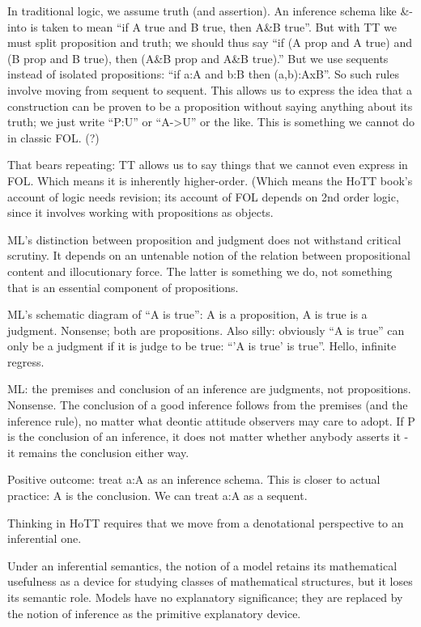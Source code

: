 \documentclass{article}
\begin{document}
In traditional logic, we assume truth (and assertion).  An inference
schema like \&-into is taken to mean ``if A true and B true, then A\&B
true''.  But with TT we must split proposition and truth; we should
thus say ``if (A prop and A true) and (B prop and B true), then (A\&B
prop and A\&B true).''  But we use sequents instead of isolated
propositions: ``if a:A and b:B then (a,b):AxB''.  So such rules
involve moving from sequent to sequent.  This allows us to express the
idea that a construction can be proven to be a proposition without
saying anything about its truth; we just write ``P:U'' or ``A->U'' or
the like.  This is something we cannot do in classic FOL. (?)

That bears repeating: TT allows us to say things that we cannot even
express in FOL.  Which means it is inherently higher-order.  (Which
means the HoTT book's account of logic needs revision; its account of
FOL depends on 2nd order logic, since it involves working with
propositions as objects.

ML's distinction  between proposition and judgment  does not withstand
critical scrutiny.  It depends on  an untenable notion of the relation
between propositional content and  illocutionary force.  The latter is
something  we do,  not something  that  is an  essential component  of
propositions.

ML's schematic diagram of ``A is true'': A is a proposition, A is true
is a judgment.  Nonsense; both are propositions.  Also silly:
obviously ``A is true'' can only be a judgment if it is judge to be
true: ``'A is true' is true''.  Hello, infinite regress.

ML: the premises and conclusion of an inference are judgments, not
propositions.  Nonsense.  The conclusion of a good inference follows
from the premises (and the inference rule), no matter what deontic
attitude observers may care to adopt.  If P is the conclusion of an
inference, it does not matter whether anybody asserts it - it remains
the conclusion either way.

Positive outcome: treat a:A as an inference schema.  This is closer to
actual practice: A is the conclusion.  We can treat a:A as a sequent.

Thinking in HoTT requires that we move from a denotational perspective
to an inferential one.

Under an inferential semantics, the notion of a model retains its
mathematical usefulness as a device for studying classes of
mathematical structures, but it loses its semantic role.  Models have
no explanatory significance; they are replaced by the notion of
inference as the primitive explanatory device.
\end{document}
